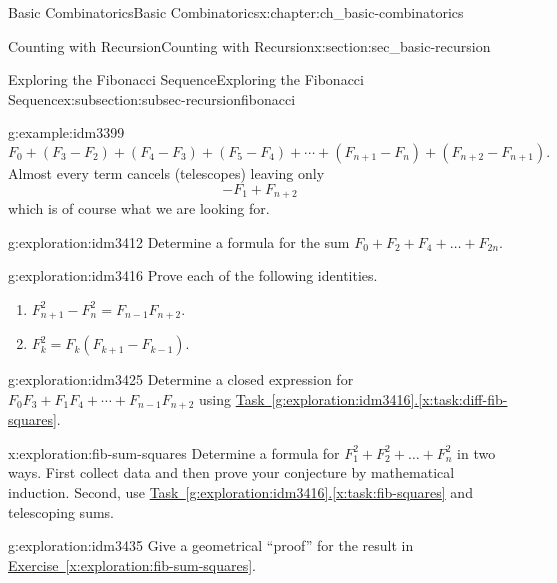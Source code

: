 \documentclass[oneside,10pt,]{book}
\numberwithin{equation}{chapter}
\newcommand{\amp}{&}
\begin{document}
\begin{chapterptx}{Basic Combinatorics}{}{Basic Combinatorics}{}{}{x:chapter:ch_basic-combinatorics}
\begin{sectionptx}{Counting with Recursion}{}{Counting with Recursion}{}{}{x:section:sec_basic-recursion}
\begin{subsectionptx}{Exploring the Fibonacci Sequence}{}{Exploring the Fibonacci Sequence}{}{}{x:subsection:subsec-recursionfibonacci}
\begin{example}{}{g:example:idm3399}
\begin{equation*}
F_0 + (F_3 - F_2) + (F_4 - F_3) + (F_5 - F_4) + \cdots + (F_{n+1} - F_n)+ (F_{n+2} - F_{n+1})\text{.}
\end{equation*}
Almost every term cancels (telescopes) leaving only%
\begin{equation*}
-F_1 + F_{n+2}
\end{equation*}
which is of course what we are looking for.%
\end{example}
\begin{exploration}{}{g:exploration:idm3412}%
Determine a formula for the sum  \(F_{0} + F_{2} + F_{4} + \ldots + F_{2n}\).%
\end{exploration}
\begin{exploration}{}{g:exploration:idm3416}%
Prove each of the following identities.%
\begin{enumerate}[font=\bfseries,label=(\alph*),ref=\alph*]
\item\label{x:task:diff-fib-squares}\(F_{n + 1}^{2} - F_{n}^{2} = F_{n - 1}F_{n + 2}\).%
\item\label{x:task:fib-squares}\(F_{k}^{2} = F_{k}(F_{k + 1} - F_{k - 1})\).%
\end{enumerate}
\end{exploration}
\begin{exploration}{}{g:exploration:idm3425}%
Determine a closed expression for \(F_{0}F_{3}
+ F_{1}F_{4} + \cdots +
F_{n-1}F_{n+2}\) using \hyperref[x:task:diff-fib-squares]{Task~\ref{g:exploration:idm3416}.\ref{x:task:diff-fib-squares}}.%
\end{exploration}
\begin{exploration}{}{x:exploration:fib-sum-squares}%
Determine a formula for \(F_{1}^{2} + F_{2}^{2} + \ldots + F_{n}^{2}\) in two ways.  First collect data and then prove your conjecture by mathematical induction.  Second, use \hyperref[x:task:fib-squares]{Task~\ref{g:exploration:idm3416}.\ref{x:task:fib-squares}} and telescoping sums.%
\end{exploration}
\begin{exploration}{}{g:exploration:idm3435}%
Give a geometrical ``proof'' for the result in \hyperref[x:exploration:fib-sum-squares]{Exercise~\ref{x:exploration:fib-sum-squares}}.%
\end{exploration}
\end{subsectionptx}
\end{sectionptx}
\end{chapterptx}
\end{document}
